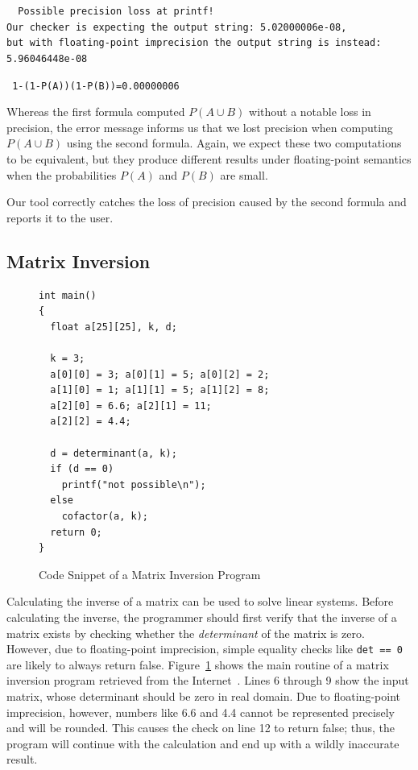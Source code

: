 {\tt\footnotesize
\textcolor{red!70!black} {
Possible precision loss at printf!\\
Our checker is expecting the output string: 5.02000006e-08,\\
but with floating-point imprecision the output string is instead: 5.96046448e-08}}

{\tt\footnotesize
1-(1-P(A))(1-P(B))=0.00000006
}

Whereas the first formula computed $P(A \cup B)$ without a notable loss in precision, the error message informs us that we lost precision when computing $P(A \cup B)$ using the second formula. Again, we expect these two computations to be equivalent, but they produce different results under floating-point semantics when the probabilities $P(A)$ and $P(B)$ are small.

Our tool correctly catches the loss of precision caused by the second formula and reports it to the user.

\subsection{Matrix Inversion}

\begin{figure}[t!]
\begin{lstlisting}
int main()
{
  float a[25][25], k, d;

  k = 3;
  a[0][0] = 3; a[0][1] = 5; a[0][2] = 2;
  a[1][0] = 1; a[1][1] = 5; a[1][2] = 8;
  a[2][0] = 6.6; a[2][1] = 11;
  a[2][2] = 4.4;
  
  d = determinant(a, k);
  if (d == 0)
    printf("not possible\n");
  else
    cofactor(a, k);
  return 0;
}
\end{lstlisting}
\caption{Code Snippet of a Matrix Inversion Program}
\label{fig:matrixinv}
\end{figure}

Calculating the inverse of a matrix can be used to solve linear systems. Before calculating the inverse, the programmer should first verify that the inverse of a matrix exists by checking whether the {\em determinant} of the matrix is zero. However, due to floating-point imprecision, simple equality checks like {\tt det == 0} are likely to always return false. Figure~\ref{fig:matrixinv} shows the main routine of a matrix inversion program retrieved from the Internet~\cite{matinvprogram}. Lines 6 through 9 show the input matrix, whose determinant should be zero in real domain. Due to floating-point imprecision, however, numbers like 6.6 and 4.4 cannot be represented precisely and will be rounded. This causes the check on line 12 to return false; thus, the program will continue with the calculation and end up with a wildly inaccurate result.

